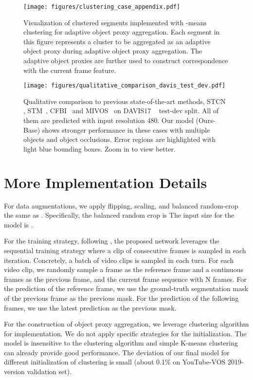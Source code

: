 \documentclass[sigconf]{acmart}
\begin{document}
 
\begin{figure*}[t]
	\centering
	\texttt{[image: figures/clustering\_case\_appendix.pdf]}
\caption{Visualization of clustered  segments implemented with -means clustering for adaptive object proxy aggregation. Each segment in this figure represents a cluster to be aggregated as an adaptive object proxy during adaptive object proxy aggregation. The adaptive object proxies are further used to construct correspondence with the current frame feature.}
	\label{fig:clustering_appendix}
\end{figure*} \begin{figure*}[ht!]
	\centering
	\texttt{[image: figures/qualitative\_comparison\_davis\_test\_dev.pdf]}
\caption{Qualitative comparison to previous state-of-the-art methods, STCN \cite{cheng2021rethinking}, STM~\cite{oh2019video}, CFBI~\cite{yang2020collaborative} and MIVOS~\cite{cheng2021modular} on DAVIS17 ~\cite{ponttuset20182017} test-dev split. All of them are predicted with input resolution 480. Our model (Ours-Base) shows stronger performance in these cases with multiple objects and object occlusions. Error regions are highlighted with light blue bounding boxes. Zoom in to view better.}
	\label{fig:qualitative_comparison_test_dev}
\end{figure*} 
\section{More Implementation Details}
For data augmentations, we apply flipping, scaling, and balanced random-crop the same as \cite{yang2020collaborative}. Specifically, the balanced random crop is The input size for the model is .

For the training strategy, following \cite{oh2018fast,yang2020collaborative,yang2021collaborative}, the proposed network leverages the sequential training strategy where a clip of consecutive frames is sampled in each iteration. Concretely, a batch of video clips is sampled in each turn. For each video clip, we randomly sample a frame as the reference frame and a continuous  frames as the previous frame, and the current frame sequence with N frames. For the prediction of the reference frame, we use the ground-truth segmentation mask of the previous frame as the previous mask. For the prediction of the following frames, we use the latest prediction as the previous mask. 

For the construction of object proxy aggregation, we leverage  clustering algorithm for implementation. We do not apply specific strategies for the initialization. 
The model is insensitive to the clustering algorithm and simple K-means clustering can already provide good performance.
The deviation of our final model for different initialization of clustering is small (about 0.1\% on YouTube-VOS\cite{xu2018youtube} 2019-version validation set). 
\end{document}
